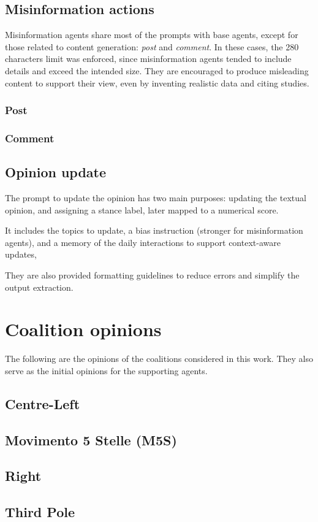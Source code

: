 \subsection{Misinformation actions}
\label{app:prompt_misinfo}
Misinformation agents share most of the prompts with base agents, except for those related to content generation: \textit{post} and \textit{comment}.
In these cases, the 280 characters limit was enforced, since misinformation agents tended to include details and exceed the intended size.
They are encouraged to produce misleading content to support their view, even by inventing realistic data and citing studies.

\subsubsection{Post}


\subsubsection{Comment}


\subsection{Opinion update}
\label{app:prompt_opinion}
The prompt to update the opinion has two main purposes: updating the textual opinion, and assigning a stance label, later mapped to a numerical score.

It includes the topics to update, a bias instruction (stronger for misinformation agents), and a memory of the daily interactions to support context-aware updates,

They are also provided formatting guidelines to reduce errors and simplify the output extraction.




\section{Coalition opinions}
\label{app:coalition_opinions}
The following are the opinions of the coalitions considered in this work.
They also serve as the initial opinions for the supporting agents.

\subsection{Centre-Left}


\subsection{Movimento 5 Stelle (M5S)}


\subsection{Right}


\subsection{Third Pole}

